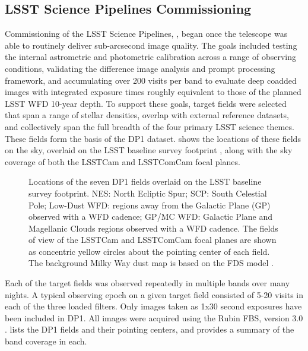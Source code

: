 \subsection{LSST Science Pipelines Commissioning}
\label{ssec:pipelines_commissioning}
Commissioning of the LSST Science Pipelines, \citep{PSTN-019},  began once the telescope was able to routinely deliver sub-arcsecond image quality.
The goals included testing the internal astrometric and photometric calibration across a range of observing conditions,
validating the difference image analysis and prompt processing \citep{dmtn-219} framework, and accumulating over 200 visits per band to evaluate
deep coadded images with integrated exposure times roughly equivalent to those of the planned LSST \gls{WFD} 10-year depth.
To support these goals, \nfields target fields were selected that span a range of stellar densities, overlap with external reference datasets, and collectively span the full breadth of the four primary \gls{LSST} science themes.
These \nfields fields form the basis of the \gls{DP1} dataset.
 shows the locations of these \nfields fields on the sky, overlaid on the LSST baseline survey footprint \citep{PSTN-051, PSTN-052, PSTN-053, PSTN-055, PSTN-056}, along with the sky coverage of both the \gls{LSSTCam} and \gls{LSSTComCam} focal planes.
\begin{figure}[bt!]
\centering
{}
\caption{Locations of the seven \gls{DP1} fields overlaid on the \gls{LSST} baseline survey footprint. NES: North Ecliptic Spur; SCP: South Celestial Pole; Low-Dust \gls{WFD}: regions away from the Galactic Plane (GP) observed with a \gls{WFD} cadence; GP/MC \gls{WFD}: Galactic Plane and Magellanic Clouds regions observed with a \gls{WFD} cadence. The fields of view of the \gls{LSSTCam} and \gls{LSSTComCam} focal planes are shown as concentric yellow circles about the pointing center of each field. The background Milky Way dust map is based on the FDS model \citep{1999ApJ...524..867F}.}
\label{fig:dp1_fields_on_sky}
\end{figure}
Each of the \nfields target fields was observed repeatedly in multiple bands over many nights.
A typical observing \gls{epoch} on a given target field consisted of 5-20 visits in each of the three loaded filters.
Only images taken as 1x30 second exposures have been included in \gls{DP1}.
All images were acquired using the Rubin \gls{FBS}, version 3.0 \citep{2019AJ....157..151N, peter_yoachim_2024_13985198}.
 lists the \nfields \gls{DP1} fields and their pointing centers, and provides a summary of the band coverage in each.

